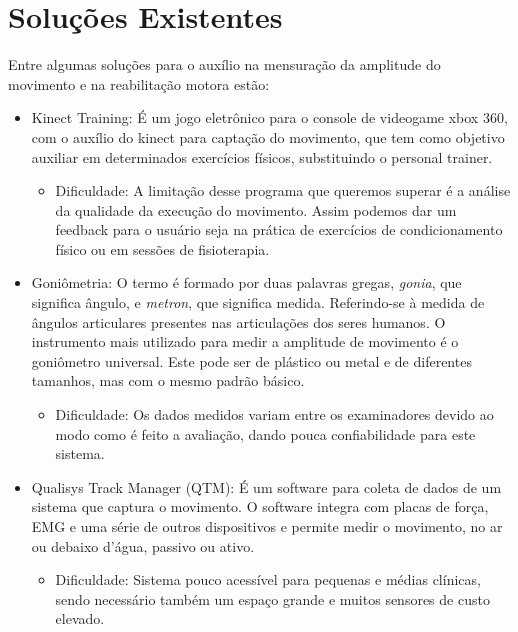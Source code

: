 \section{Soluções Existentes}                                                   
\label{Sec:SolucoesExistentes}
Entre algumas soluções para o auxílio na mensuração da amplitude do movimento
e na reabilitação motora estão:
\begin{itemize}

\item Kinect Training: É um jogo eletrônico para o console de videogame xbox 
360, com o auxílio do kinect para captação do movimento, que tem como objetivo 
auxiliar em determinados exercícios físicos, substituindo o personal trainer.
  \begin{itemize}
  \item Dificuldade: A limitação desse programa que queremos superar é a 
  análise da qualidade da execução do movimento. Assim podemos dar um feedback 
  para o usuário seja na prática de exercícios de  condicionamento físico ou em 
  sessões de fisioterapia.
  \end{itemize}

\item Goniômetria: O termo é formado por duas palavras gregas, \textit{gonia}, 
que significa ângulo, e \textit{metron}, que significa medida. Referindo-se à 
medida de ângulos articulares presentes nas articulações dos seres humanos. 
O instrumento mais utilizado para medir a amplitude de movimento é o goniômetro 
universal. Este pode ser de plástico ou metal e de diferentes tamanhos, mas com
 o mesmo padrão básico\cite{manualGoniometria}.
  \begin{itemize}
  \item Dificuldade: Os dados medidos variam entre os examinadores devido ao modo como 
  é feito a avaliação,  dando pouca confiabilidade para este sistema.
  \end{itemize}

\item Qualisys Track Manager (QTM): É um software para coleta de dados de um 
sistema que captura o movimento. O software integra com placas de força, EMG 
e uma série de outros dispositivos e permite medir o movimento, no ar 
ou debaixo d'água, passivo ou ativo\cite{qtm}.
  \begin{itemize}
  \item Dificuldade: Sistema pouco acessível para pequenas e médias clínicas, 
  sendo necessário também um espaço grande e muitos sensores de custo elevado.
  \end{itemize}


\end{itemize}
